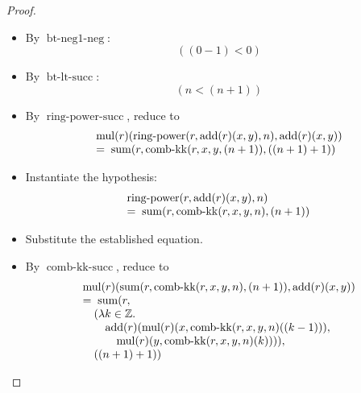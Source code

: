 \documentclass[11pt]{article}
\theoremstyle{plain}
\begin{document}
\begin{proof}
\begin{itemize}[leftmargin=2.8em, itemsep=4pt, parsep=1pt]
  \item[\textbf{28}] By $\operatorname{bt\text{-}neg1\text{-}neg}$:
\begin{equation*}
((0 - 1) < 0)
\end{equation*}

  \item[\textbf{29}] By $\operatorname{bt\text{-}lt\text{-}succ}$:
\begin{equation*}
(n < (n + 1))
\end{equation*}

  \item[\textbf{30}] By $\operatorname{ring\text{-}power\text{-}succ}$, reduce to
\begin{equation*}
\begin{array}{@{}l@{}} \operatorname{mul}(r)(\operatorname{ring\text{-}power}(r, \operatorname{add}(r)(x, y), n), \operatorname{add}(r)(x, y)) \\ =\; \operatorname{sum}(r, \operatorname{comb\text{-}kk}(r, x, y, (n + 1)), ((n + 1) + 1)) \end{array}
\end{equation*}

  \item[\textbf{31--33}] Instantiate the hypothesis:
\begin{equation*}
\begin{array}{@{}l@{}} \operatorname{ring\text{-}power}(r, \operatorname{add}(r)(x, y), n) \\ =\; \operatorname{sum}(r, \operatorname{comb\text{-}kk}(r, x, y, n), (n + 1)) \end{array}
\end{equation*}

  \item[\textbf{34}] Substitute the established equation.
  \item[\textbf{35}] By $\operatorname{comb\text{-}kk\text{-}succ}$, reduce to
\begin{equation*}
\begin{array}{@{}l@{}} \operatorname{mul}(r)(\operatorname{sum}(r, \operatorname{comb\text{-}kk}(r, x, y, n), (n + 1)), \operatorname{add}(r)(x, y)) \\ =\; \operatorname{sum}(r, \\ \quad (\lambda k \in \mathbb{Z}.\; \\ \quad \quad \operatorname{add}(r)(\operatorname{mul}(r)(x, \operatorname{comb\text{-}kk}(r, x, y, n)((k - 1))), \\ \quad \quad \quad \operatorname{mul}(r)(y, \operatorname{comb\text{-}kk}(r, x, y, n)(k)))), \\ \quad ((n + 1) + 1)) \end{array}
\end{equation*}


\end{itemize}
\end{proof}
\end{document}
